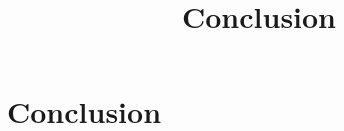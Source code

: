 \documentclass{article}
\begin{document}
\title{Conclusion}
\maketitle \else \fi

\section{Conclusion}\label{sec:conclusion}


\ifx \allfiles \undefined
\end{document}
